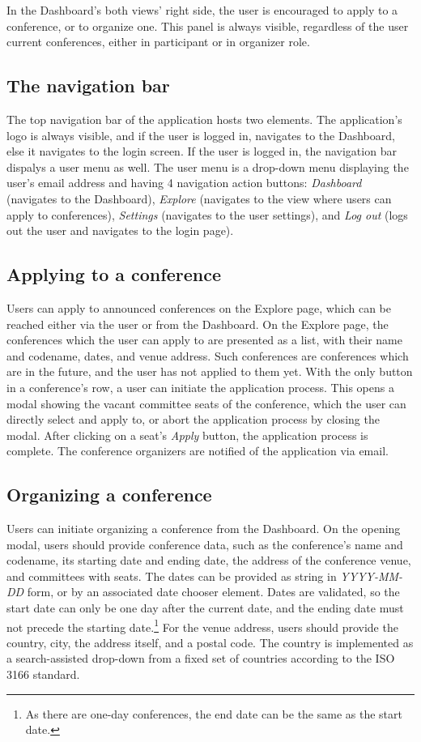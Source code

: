 In the Dashboard's both views' right side, the user is encouraged to apply to a conference, or to organize one. This panel is always visible, regardless of the user current conferences, either in participant or in organizer role.

\subsection{The navigation bar}

The top navigation bar of the application hosts two elements. The application's logo is always visible, and if the user is logged in, navigates to the Dashboard, else it navigates to the login screen. If the user is logged in, the navigation bar dispalys a user menu as well. The user menu is a drop-down menu displaying the user's email address and having 4 navigation action buttons: \emph{Dashboard} (navigates to the Dashboard), \emph{Explore} (navigates to the view where users can apply to conferences), \emph{Settings} (navigates to the user settings), and \emph{Log out} (logs out the user and navigates to the login page).

\subsection{Applying to a conference}

Users can apply to announced conferences on the Explore page, which can be reached either via the user or from the Dashboard. On the Explore page, the conferences which the user can apply to are presented as a list, with their name and codename, dates, and venue address. Such conferences are conferences which are in the future, and the user has not applied to them yet. With the only button in a conference's row, a user can initiate the application process. This opens a modal showing the vacant committee seats of the conference, which the user can directly select and apply to, or abort the application process by closing the modal. After clicking on a seat's \emph{Apply} button, the application process is complete. The conference organizers are notified of the application via email.

\subsection{Organizing a conference}

Users can initiate organizing a conference from the Dashboard. On the opening modal, users should provide conference data, such as the conference's name and codename, its starting date and ending date, the address of the conference venue, and committees with seats. The dates can be provided as string in \emph{YYYY-MM-DD} form, or by an associated date chooser element. Dates are validated, so the start date can only be one day after the current date, and the ending date must not precede the starting date.\footnote{As there are one-day conferences, the end date can be the same as the start date.} For the venue address, users should provide the country, city, the address itself, and a postal code. The country is implemented as a search-assisted drop-down from a fixed set of countries according to the ISO 3166 standard.

